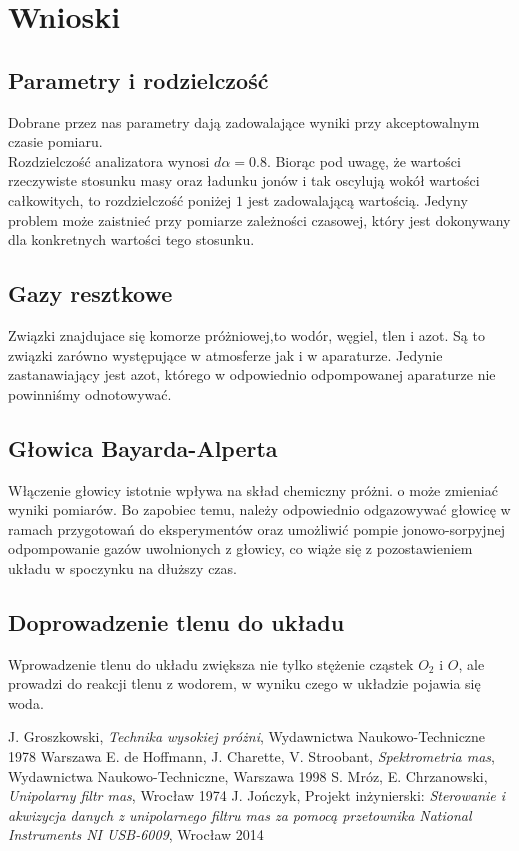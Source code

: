 \documentclass[paper=a4, fontsize=12pt]{scrartcl}
\begin{document}
\section{Wnioski}
\subsection{Parametry i rodzielczość}
Dobrane przez nas parametry dają zadowalające wyniki przy akceptowalnym czasie pomiaru.\\
Rozdzielczość analizatora wynosi $d\alpha=0.8$. Biorąc pod uwagę, że wartości rzeczywiste stosunku masy oraz ładunku jonów i tak oscylują wokół wartości całkowitych, to rozdzielczość poniżej $1$ jest zadowalającą wartością. Jedyny problem może zaistnieć przy pomiarze zależności czasowej, który jest dokonywany dla konkretnych wartości tego stosunku.
\subsection{Gazy resztkowe}
Związki znajdujace się komorze próżniowej,to wodór, węgiel, tlen i azot. Są to związki zarówno występujące w atmosferze jak i w aparaturze. Jedynie zastanawiający jest azot, którego w odpowiednio odpompowanej aparaturze nie powinniśmy odnotowywać.
\subsection{Głowica Bayarda-Alperta}
Włączenie głowicy istotnie wpływa na skład chemiczny próżni. o może zmieniać wyniki pomiarów. Bo zapobiec temu, należy odpowiednio odgazowywać głowicę w ramach przygotowań do eksperymentów oraz umożliwić pompie jonowo-sorpyjnej odpompowanie gazów uwolnionych z głowicy, co wiąże się z pozostawieniem układu w spoczynku na dłuższy czas.
\subsection{Doprowadzenie tlenu do układu}
Wprowadzenie tlenu do układu zwiększa nie tylko stężenie cząstek $O_2$ i $O$, ale prowadzi do reakcji tlenu z wodorem, w wyniku czego w układzie pojawia się woda.
\begin{thebibliography}{99}

	 J. Groszkowski, \emph{Technika wysokiej próżni}, Wydawnictwa Naukowo-Techniczne 1978 Warszawa
	 E. de Hoffmann, J. Charette, V. Stroobant, \emph{Spektrometria mas}, Wydawnictwa Naukowo-Techniczne, Warszawa 1998
	 S. Mróz, E. Chrzanowski, \emph{Unipolarny filtr mas}, Wrocław 1974
	 J. Jończyk, Projekt inżynierski: \emph{Sterowanie i akwizycja danych z unipolarnego filtru mas za pomocą przetownika National Instruments NI USB-6009}, Wrocław 2014
	
\end{thebibliography}
\end{document}
